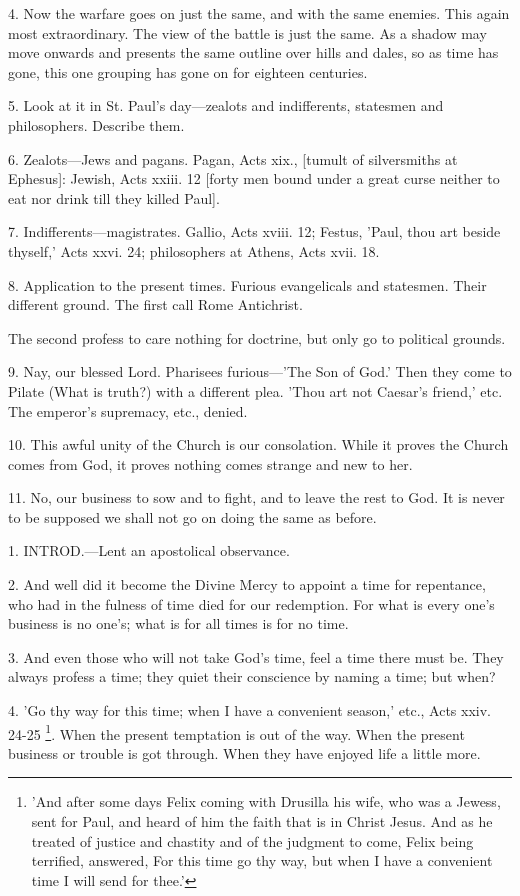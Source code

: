4. Now the warfare goes on just the same, and
with the same enemies. This again most extraordinary. The view of the
battle is just the same. As a shadow may move onwards and presents the
same outline over hills and dales, so as time has gone, this one
grouping has gone on for eighteen centuries.

5. Look at it in St. Paul's day—zealots and
indifferents, statesmen and philosophers. Describe them.

6. Zealots—Jews and pagans. Pagan, Acts xix.,
[tumult of silversmiths at Ephesus]: Jewish, Acts xxiii. 12 [forty men
bound under a great curse neither to eat nor drink till they killed
Paul].

7. Indifferents—magistrates. Gallio, Acts xviii.
12; Festus, 'Paul, thou art beside thyself,' Acts xxvi. 24;
philosophers at Athens, Acts xvii. 18.

8. Application to the present times. Furious
evangelicals and statesmen. Their different ground. The first call
Rome Antichrist.

The second profess to care nothing for doctrine,
but only go to political grounds.

9. Nay, our blessed Lord. Pharisees
furious—'The Son of God.' Then they come to Pilate (What is truth?)
with a different plea. 'Thou art not Caesar's friend,' etc. The
emperor's supremacy, etc., denied.

10. This awful unity of the Church is our
consolation. While it proves the Church comes from God, it proves
nothing comes strange and new to her.

11. No, our business to sow and to fight, and to
leave the rest to God. It is never to be supposed we shall not go on
doing the same as before.


1. INTROD.—Lent
an apostolical observance.

2. And well did it become the Divine Mercy to
appoint a time for repentance, who had in the fulness of time died for
our redemption. For what is every one's business is no one's; what is
for all times is for no time.

3. And even those who will not take God's time,
feel a time there must be. They always profess a time; they quiet
their conscience by naming a time; but when?

4. 'Go thy way for this time; when I have a
convenient season,' etc., Acts xxiv. 24-25 \footnote{'And after some days
Felix coming with Drusilla his wife, who was a Jewess, sent for Paul,
and heard of him the faith that is in Christ Jesus. And as he treated
of justice and chastity and of the judgment to come, Felix being
terrified, answered, For this time go thy way, but when I have a
convenient time I will send for thee.'}. When the present temptation is out of the way. When the
present business or trouble is got through. When they have enjoyed
life a little more.

